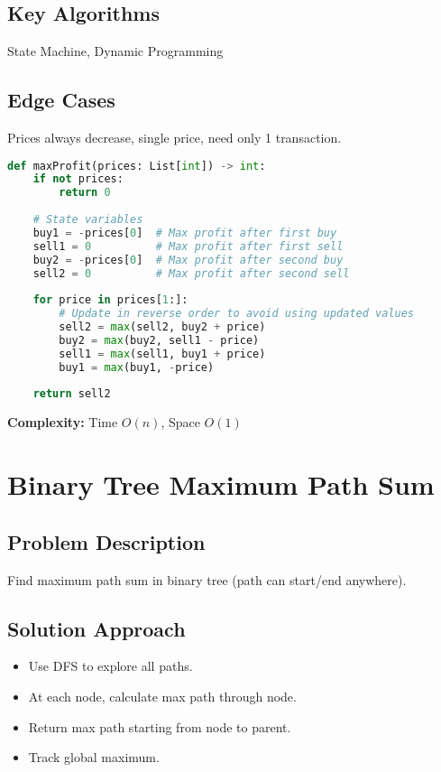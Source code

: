 \documentclass[10pt, a4paper]{article}
\begin{document}
\subsection*{Key Algorithms}
State Machine, Dynamic Programming

\subsection*{Edge Cases}
Prices always decrease, single price, need only 1 transaction.

\begin{lstlisting}[language=Python]
def maxProfit(prices: List[int]) -> int:
    if not prices:
        return 0
    
    # State variables
    buy1 = -prices[0]  # Max profit after first buy
    sell1 = 0          # Max profit after first sell
    buy2 = -prices[0]  # Max profit after second buy
    sell2 = 0          # Max profit after second sell
    
    for price in prices[1:]:
        # Update in reverse order to avoid using updated values
        sell2 = max(sell2, buy2 + price)
        buy2 = max(buy2, sell1 - price)
        sell1 = max(sell1, buy1 + price)
        buy1 = max(buy1, -price)
    
    return sell2
\end{lstlisting}
\textbf{Complexity:} Time $O(n)$, Space $O(1)$

\section{Binary Tree Maximum Path Sum}
\subsection*{Problem Description}
Find maximum path sum in binary tree (path can start/end anywhere).

\subsection*{Solution Approach}
\begin{itemize}
    \item Use DFS to explore all paths.
    \item At each node, calculate max path through node.
    \item Return max path starting from node to parent.
    \item Track global maximum.
\end{itemize}
\end{document}
